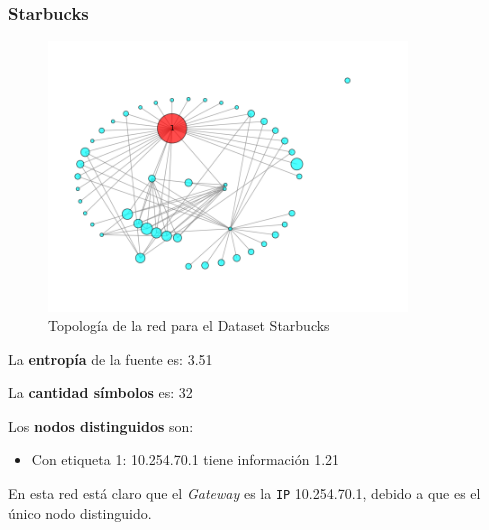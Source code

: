 \subsubsection{Starbucks}

\begin{figure}[H]
    \centering
    \includegraphics[width=0.85\textwidth]{imagenes/starbucks.png}
    \caption{Topología de la red para el Dataset Starbucks}
\end{figure}

La \textbf{entropía} de la fuente es: 3.51

La \textbf{cantidad símbolos} es: 32

Los \textbf{nodos distinguidos} son:

\begin{itemize}
    \item Con etiqueta 1: 10.254.70.1 tiene información 1.21
\end{itemize}

En esta red está claro que el \textit{Gateway} es la \texttt{IP} 10.254.70.1, debido a que
es el único nodo distinguido.
